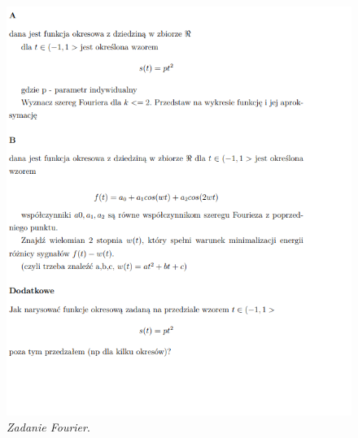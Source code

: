 \documentclass[12pt,oneside,a4paper]{book} %
\begin{document}
\begin{figure}[h]
\begin{center} 
\includegraphics[scale=0.9]{./images/ZadanieSyganly.PNG} 
\caption{\textit{Zadanie Fourier}.\newline }
\label{rys:logoup}
\end{center}
\end{figure}



\end{document}
